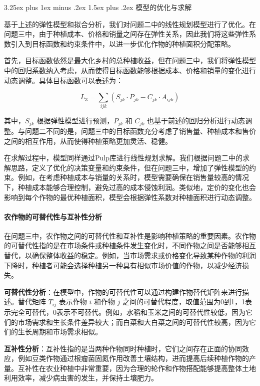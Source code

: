\documentclass[12pt,a4paper]{nmmcm}
\makeatletter
\renewcommand\subsection{\@startsection{subsection}{2}{0pt}%
    {3.25ex plus 1ex minus .2ex}%
    {1.5ex plus .2ex}%
    {\normalfont\Large\bfseries}}
\makeatother
\begin{document}
\subsection{模型的优化与求解}

基于上述的弹性模型和拟合分析，我们对问题二中的线性规划模型进行了优化。在问题三中，由于种植成本、价格和销量之间存在弹性关系，因此我们将这些弹性系数引入到目标函数和约束条件中，以进一步优化作物的种植面积分配策略。

首先，目标函数依然是最大化乡村的总种植收益，但在问题三中，我们将弹性模型中的回归系数纳入考虑，从而使得目标函数能够根据成本、价格和销量的变化进行动态调整。具体目标函数可以表述为：

\[
  L_3 = \sum_{ijk} \left( S_{jk} \cdot P_{jk} - C_{jk} \cdot A_{ijk} \right)
\]

其中，$S_{jk}$ 根据弹性模型进行预测，$P_{jk}$ 和 $C_{jk}$ 也基于前述的回归分析进行动态调整。与问题二不同的是，问题三中的目标函数充分考虑了销售量、种植成本和售价之间的相互作用，从而使得种植策略更加灵活、稳健。

在求解过程中，模型同样通过Pulp库进行线性规划求解。我们根据问题二中的求解思路，定义了优化的决策变量和约束条件，但在问题三中，增加了弹性模型的约束。例如，在考虑种植成本与销量的关系时，模型需要确保在销售量较高的情况下，种植成本能够合理控制，避免过高的成本侵蚀利润。类似地，定价的变化也会影响到每个作物的最优种植面积，模型会根据弹性系数对种植面积进行动态调整。


\paragraph{农作物的可替代性与互补性分析}

在问题三中，农作物之间的可替代性和互补性是影响种植策略的重要因素。农作物的可替代性指的是在市场条件或种植条件发生变化时，不同作物之间是否能够相互替代，以确保整体收益的稳定。例如，当市场需求或价格变化导致某种作物的利润下降时，种植者可能会选择种植另一种具有相似市场价值的作物，以减少经济损失。

\textbf{可替代性分析}：在模型中，作物的可替代性可以通过构建作物替代矩阵来进行描述。替代矩阵 $T_{ij}$ 表示作物 $i$ 和作物 $j$ 之间的可替代程度，取值范围为0到1，1表示完全可替代，0表示不可替代。例如，水稻和玉米之间的可替代性较低，因为它们的市场需求和生长条件差异较大；而白菜和大白菜之间的可替代性较高，因为它们的生长周期和市场需求相似。

\textbf{互补性分析}：互补性指的是当两种作物同时种植时，它们之间存在正面的协同效应，例如豆类作物通过根瘤菌固氮作用改善土壤结构，进而提高后续种植作物的产量。互补性在农业种植中非常重要，因为合理的轮作和作物搭配能够提高整体土地利用效率，减少病虫害的发生，并保持土壤肥力。
\end{document}

